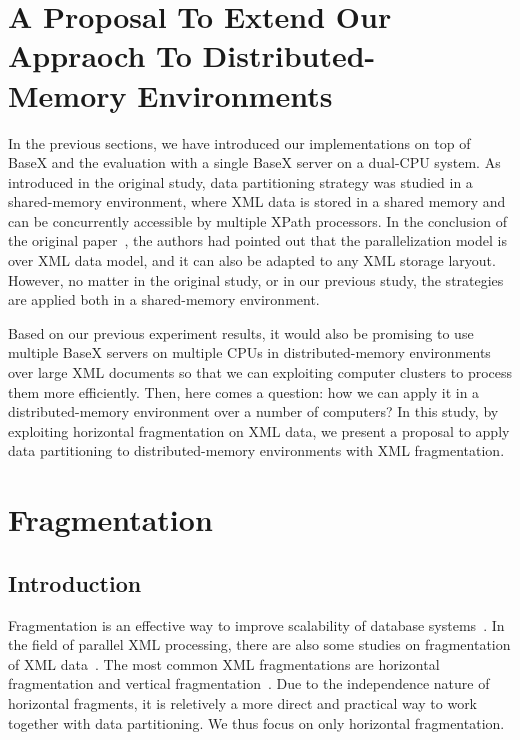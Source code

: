 \section{A Proposal To Extend Our Appraoch To Distributed-\\Memory Environments}

In the previous sections, we have introduced our implementations on top of BaseX
and the evaluation with a single BaseX server on a dual-CPU system. As
introduced in the original study, data partitioning strategy was studied in a
shared-memory environment, where XML data is stored in a shared memory and can
be concurrently accessible by multiple XPath processors. In the conclusion of
the original paper~\cite{BoLS09},  the authors had pointed out that the
parallelization model is over XML data model, and it can also be adapted to any
XML storage laryout. However,  no matter in the original study, or in our
previous study, the strategies  are applied both in a shared-memory environment. 

Based on our previous experiment results, it would also be promising to use
multiple BaseX servers on multiple CPUs in distributed-memory environments over
large XML documents so that we can exploiting computer clusters to process  them
more efficiently. Then, here comes a question: how we can apply it in a
distributed-memory environment over a number of computers?  In this study, by
exploiting horizontal fragmentation on XML data, we present a  proposal to apply
data partitioning to distributed-memory environments with XML  fragmentation.

\section{Fragmentation}
\subsection{Introduction}

Fragmentation is an effective way to improve scalability of database
systems~\cite{navathe1995mixed, hauglid2010dyfram, khan2010new}.  In the field
of parallel XML processing, there are also some studies on  fragmentation of XML
data~\cite{kling11:dist_xml, KlOD10}.  The most common XML fragmentations are
horizontal fragmentation and vertical fragmentation~\cite{kling11:dist_xml}. Due
to the independence nature of horizontal fragments, it is reletively a more
direct and practical way to work together with data partitioning. We thus focus
on only horizontal fragmentation.

